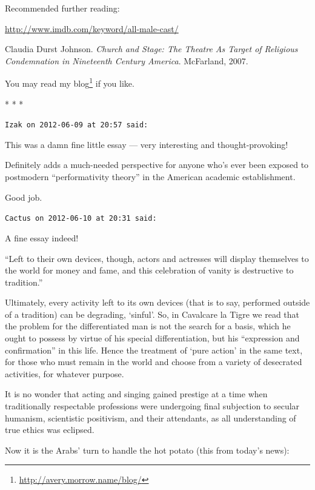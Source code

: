 Recommended further reading:

\url{http://www.imdb.com/keyword/all-male-cast/}

Claudia Durst Johnson. \emph{Church and Stage: The Theatre As Target of Religious Condemnation in Nineteenth Century America}. McFarland, 2007.

You may read my blog\footnote{\url{http://avery.morrow.name/blog/}} if you like.



\begin{center}* * *\end{center}

\begin{footnotesize}
\begin{sffamily}
\texttt{Izak on 2012-06-09 at 20:57 said:}

This was a damn fine little essay --- very interesting and thought-provoking!

Definitely adds a much-needed perspective for anyone who's ever been exposed to postmodern ``performativity theory'' in the American academic establishment.

Good job.

\hfill

\texttt{Cactus on 2012-06-10 at 20:31 said:}

A fine essay indeed!

``Left to their own devices, though, actors and actresses will display themselves to the world for money and fame, and this celebration of vanity is destructive to tradition.''

Ultimately, every activity left to its own devices (that is to say, performed outside of a tradition) can be degrading, `sinful'. So, in Cavalcare la Tigre we read that the problem for the differentiated man is not the search for a basis, which he ought to possess by virtue of his special differentiation, but his ``expression and confirmation'' in this life. Hence the treatment of `pure action' in the same text, for those who must remain in the world and choose from a variety of desecrated activities, for whatever purpose.

It is no wonder that acting and singing gained prestige at a time when traditionally respectable professions were undergoing final subjection to secular humanism, scientistic positivism, and their attendants, as all understanding of true ethics was eclipsed.

Now it is the Arabs' turn to handle the hot potato (this from today's news):


\end{sffamily}
\end{footnotesize}
